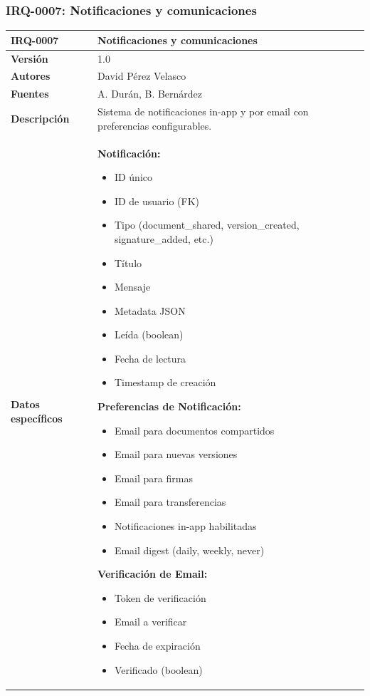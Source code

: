 \documentclass[11pt, a4paper]{article}
\begin{document}
\subsubsection{IRQ-0007: Notificaciones y comunicaciones}

\begin{table}[H]
    \centering
    \small
    \begin{tabular}{|p{4cm}|p{10cm}|}
    \hline
    \textbf{IRQ-0007} & Notificaciones y comunicaciones \\
    \hline
    \textbf{Versión} & 1.0 \\
    \hline
    \textbf{Autores} & David Pérez Velasco \\
    \hline
    \textbf{Fuentes} & A. Durán, B. Bernárdez \\
    \hline
    \textbf{Descripción} & Sistema de notificaciones in-app y por email con preferencias configurables. \\
    \hline
    \textbf{Datos específicos} & 
    \textbf{Notificación:}
    \begin{itemize}
        \item ID único
        \item ID de usuario (FK)
        \item Tipo (document\_shared, version\_created, signature\_added, etc.)
        \item Título
        \item Mensaje
        \item Metadata JSON
        \item Leída (boolean)
        \item Fecha de lectura
        \item Timestamp de creación
    \end{itemize}
    
    \textbf{Preferencias de Notificación:}
    \begin{itemize}
        \item Email para documentos compartidos
        \item Email para nuevas versiones
        \item Email para firmas
        \item Email para transferencias
        \item Notificaciones in-app habilitadas
        \item Email digest (daily, weekly, never)
    \end{itemize}
    
    \textbf{Verificación de Email:}
    \begin{itemize}
        \item Token de verificación
        \item Email a verificar
        \item Fecha de expiración
        \item Verificado (boolean)
    \end{itemize}
    

\end{tabular}
\end{table}
\end{document}

